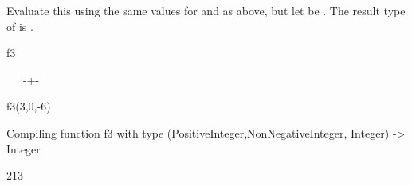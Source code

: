 \begin{xtc}
\begin{xtccomment}
Evaluate this using the same values for  and 
as above, but let  be .
The result type of  is .
\end{xtccomment}
\begin{spadsrc}
f3 
\end{spadsrc}
\begin{TeXOutput}
\begin{fricasmath}{12}
\ \ \SYMBOL{==%
}\ -{}+-{}%
\end{fricasmath}
\end{TeXOutput}
\end{xtc}
\begin{xtc}
\begin{xtccomment}
\end{xtccomment}
\begin{spadsrc}
f3(3,0,-6) 
\end{spadsrc}
\begin{MessageOutput}
   Compiling function f3 with type (PositiveInteger,NonNegativeInteger,
      Integer) -> Integer 
\end{MessageOutput}
\begin{TeXOutput}
\begin{fricasmath}{13}
213%
\end{fricasmath}
\end{TeXOutput}
\end{xtc}


